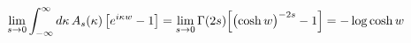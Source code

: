 \begin{equation*}
\lim_{s\to 0}\int_{-\infty}^{\infty}d\kappa\,A_s(\kappa)\,
\bigl[e^{i\kappa w}-1\bigr]=\lim_{s\to 0}\Gamma(2s)
\Bigl[\bigl(\cosh w\bigr)^{-2s}-1\Bigr]
=-\log\cosh w
\end{equation*}

